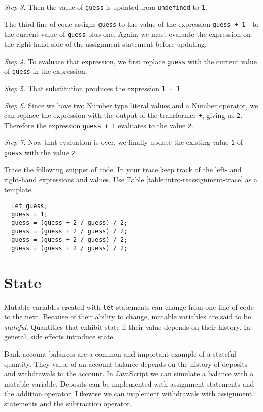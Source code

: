 \textit{Step 3.} Then the value of \texttt{guess} is updated from
\texttt{undefined} to \texttt{1}.

The third line of code assigns \texttt{guess} to the value of the expression
\texttt{guess~+~1}---to the current value of \texttt{guess} plus one. Again, we
must evaluate the expression on the right-hand side of the assignment statement
before updating.

\textit{Step 4.} To evaluate that expression, we first replace \texttt{guess}
with the current value of \texttt{guess} in the expression.

\textit{Step 5.} That substitution produces the expression \texttt{1 + 1}.

\textit{Step 6.} Since we have two \textsf{Number} type literal values and a
\textsf{Number} operator, we can replace the expression with the output of the
transformer \texttt{+}, giving us \texttt{2}. Therefore the expression
\texttt{guess~+~1} evaluates to the value \texttt{2}.

\textit{Step 7.} Now that evaluation is over, we finally update the existing
value \texttt{1} of \texttt{guess} with the value \texttt{2}.

\begin{question}
Trace the following snippet of code. In your trace keep track of the left- and
right-hand expressions and values. Use Table
\ref{table:intro-reassignment-trace} as a template.

  \begin{lstlisting}
  let guess;
  guess = 1;
  guess = (guess + 2 / guess) / 2;
  guess = (guess + 2 / guess) / 2;
  guess = (guess + 2 / guess) / 2;
  guess = (guess + 2 / guess) / 2;
  \end{lstlisting}
\end{question}

\section{State}
Mutable variables created with \texttt{let} statements can change from one line
of code to the next. Because of their ability to change, mutable variables are
said to be \emph{stateful}. Quantities that exhibit state if their value depends
on their history.  In general, side effects introduce state.

Bank account balances are a common and important example of a stateful quantity.
They value of an account balance depends on the history of deposits and
withdrawals to the account. In JavaScript we can simulate a balance with a
mutable variable. Deposits can be implemented with assignment statements and the
addition operator. Likewise we can implement withdrawals with assignment
statements and the subtraction operator.

